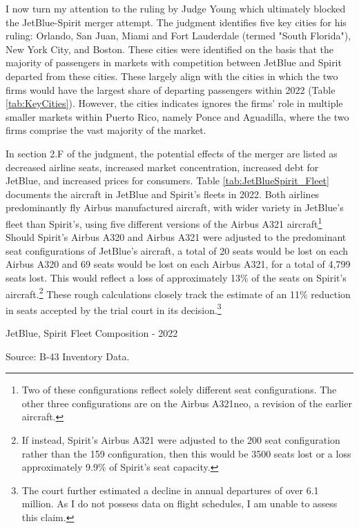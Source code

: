 \documentclass{article}
\begin{document}
	I now turn my attention to the ruling by Judge Young which ultimately blocked the JetBlue-Spirit merger attempt. The judgment identifies five key cities for his ruling: Orlando, San Juan, Miami and Fort Lauderdale (termed "South Florida"), New York City, and Boston. These cities were identified on the basis that the majority of passengers in markets with competition between JetBlue and Spirit departed from these cities. These largely align with the cities in which the two firms would have the largest share of departing passengers within 2022 (Table \ref{tab:KeyCities}). However, the cities indicates ignores the firms' role in multiple smaller markets within Puerto Rico, namely Ponce and Aguadilla, where the two firms comprise the vast majority of the market. 
	
	In section 2.F of the judgment, the potential effects of the merger are listed as decreased airline seats, increased market concentration, increased debt for JetBlue, and increased prices for consumers. Table \ref{tab:JetBlueSpirit_Fleet} documents the aircraft in JetBlue and Spirit's fleets in 2022. Both airlines predominantly fly Airbus manufactured aircraft, with wider variety in JetBlue's fleet than Spirit's, using five different versions of the Airbus A321 aircraft\footnote{Two of these configurations reflect solely different seat configurations. The other three configurations are on the Airbus A321neo, a revision of the earlier aircraft.} Should Spirit's Airbus A320 and Airbus A321 were adjusted to the predominant seat configurations of JetBlue's aircraft, a total of 20 seats would be lost on each Airbus A320 and 69 seats would be lost on each Airbus A321, for a total of 4,799 seats lost. This would reflect a loss of approximately 13\% of the seats on Spirit's aircraft.\footnote{If instead, Spirit's Airbus A321 were adjusted to the 200 seat configuration rather than the 159 configuration, then this would be 3500 seats lost or a loss approximately 9.9\% of Spirit's seat capacity.} These rough calculations closely track the estimate of an 11\% reduction in seats accepted by the trial court in its decision.\footnote{The court further estimated a decline in annual departures of over 6.1 million. As I do not possess data on flight schedules, I am unable to assess this claim.} 
    
    \begin{table}
        \begin{center}
            \caption{JetBlue, Spirit Fleet Composition - 2022}
            \label{tab:JetBlueSpirit_Fleet}
            \vspace{-10mm}
            
        \end{center}
        \footnotesize{Source: B-43 Inventory Data. }
    \end{table}
\end{document}
